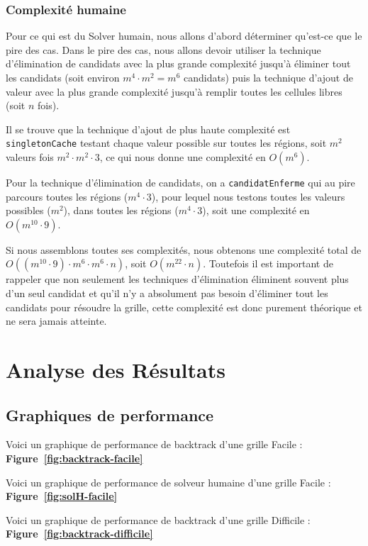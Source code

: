 \documentclass[a4paper]{article}
\begin{document}
\subsubsection{Complexité humaine}
Pour ce qui est du Solver humain, nous allons d'abord déterminer qu'est-ce que le pire des cas. Dans le pire des cas, nous allons devoir utiliser la technique d'élimination de candidats avec la plus grande complexité jusqu'à éliminer tout les candidats (soit environ $m^4 \cdot m^2 = m^6$ candidats) puis la technique d'ajout de valeur avec la plus grande complexité jusqu'à remplir toutes les cellules libres (soit $n$ fois).

Il se trouve que la technique d'ajout de plus haute complexité est \texttt{singletonCache} testant chaque valeur possible sur toutes les régions, soit $m^2$ valeurs fois $m^2 \cdot m^2 \cdot 3$, ce qui nous donne une complexité en $O(m^6)$.

Pour la technique d'élimination de candidats, on a \texttt{candidatEnferme} qui au pire parcours toutes les régions ($m^4 \cdot 3$), pour lequel nous testons toutes les valeurs possibles ($m^2$), dans toutes les régions ($m^4 \cdot 3$), soit une complexité en $O(m^{10} \cdot 9)$.

Si nous assemblons toutes ses complexités, nous obtenons une complexité total de $O((m^{10} \cdot 9) \cdot m^6 \cdot m^6 \cdot n)$, soit $O(m^{22} \cdot n)$. Toutefois il est important de rappeler que non seulement les techniques d'élimination éliminent souvent plus d'un seul candidat et qu'il n'y a absolument pas besoin d'éliminer tout les candidats pour résoudre la grille, cette complexité est donc purement théorique et ne sera jamais atteinte.
\vspace{0.5cm}

\section{Analyse des Résultats}

\subsection{Graphiques de performance}
Voici un graphique de performance de backtrack d'une grille Facile : \textbf{Figure~\ref{fig:backtrack-facile}}

Voici un graphique de performance de solveur humaine d'une grille Facile : \textbf{Figure~\ref{fig:solH-facile}}

Voici un graphique de performance de backtrack d'une grille Difficile : \textbf{Figure~\ref{fig:backtrack-difficile}}
\end{document}
